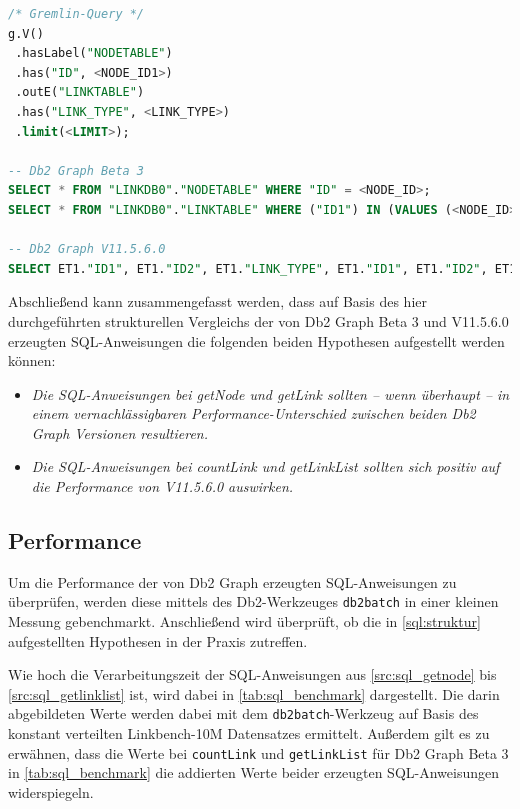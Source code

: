 \begin{lstlisting}[caption={Generierter SQL-Code getLinkList},label=src:sql_getlinklist,language=SQL]
/* Gremlin-Query */
g.V()
 .hasLabel("NODETABLE")
 .has("ID", <NODE_ID1>)
 .outE("LINKTABLE")
 .has("LINK_TYPE", <LINK_TYPE>)
 .limit(<LIMIT>);

-- Db2 Graph Beta 3
SELECT * FROM "LINKDB0"."NODETABLE" WHERE "ID" = <NODE_ID>;
SELECT * FROM "LINKDB0"."LINKTABLE" WHERE ("ID1") IN (VALUES (<NODE_ID>)) AND "LINK_TYPE" = <LINK_TYPE>;

-- Db2 Graph V11.5.6.0
SELECT ET1."ID1", ET1."ID2", ET1."LINK_TYPE", ET1."ID1", ET1."ID2", ET1."VISIBILITY", ET1."LINK_TYPE", ET1."DATA", ET1."ID2", ET1."ID1", ET1."VERSION", ET1."TIME" FROM "LINKDB0"."NODETABLE" AS VT0, "LINKDB0"."LINKTABLE" AS ET1 WHERE VT0."ID" = <NODE_ID> AND ET1."LINK_TYPE" = <LINK_TYPE> AND VT0.ID = ET1.ID1 FETCH FIRST <LIMIT> ROWS ONLY;
\end{lstlisting}

Abschließend kann zusammengefasst werden, dass auf Basis des hier durchgeführten strukturellen Vergleichs der von Db2 Graph Beta 3 und V11.5.6.0 erzeugten SQL-Anweisungen die folgenden beiden Hypothesen aufgestellt werden können:
\begin{itemize}
    \item \textit{Die SQL-Anweisungen bei getNode und getLink sollten -- wenn überhaupt -- in einem vernachlässigbaren Performance-Unterschied zwischen beiden Db2 Graph Versionen resultieren.}
    \item  \textit{Die SQL-Anweisungen bei countLink und getLinkList sollten sich  positiv auf die Performance von V11.5.6.0 auswirken.}
\end{itemize}

\subsection{Performance}
\label{sql:performance}
Um die Performance der von Db2 Graph erzeugten SQL-Anweisungen zu überprüfen, werden diese mittels des Db2-Werkzeuges \texttt{db2batch} in einer kleinen Messung gebenchmarkt. Anschließend wird überprüft, ob die in \autoref{sql:struktur} aufgestellten Hypothesen in der Praxis zutreffen.

Wie hoch die Verarbeitungszeit der SQL-Anweisungen aus \autoref{src:sql_getnode} bis \autoref{src:sql_getlinklist} ist, wird dabei in \autoref{tab:sql_benchmark} dargestellt. Die darin abgebildeten Werte werden dabei mit dem \texttt{db2batch}-Werkzeug auf Basis des konstant verteilten Linkbench-10M Datensatzes ermittelt.  Außerdem gilt es zu erwähnen, dass die Werte bei \texttt{countLink} und \texttt{getLinkList} für Db2 Graph Beta 3 in \autoref{tab:sql_benchmark} die addierten Werte beider erzeugten SQL-Anweisungen widerspiegeln. 

